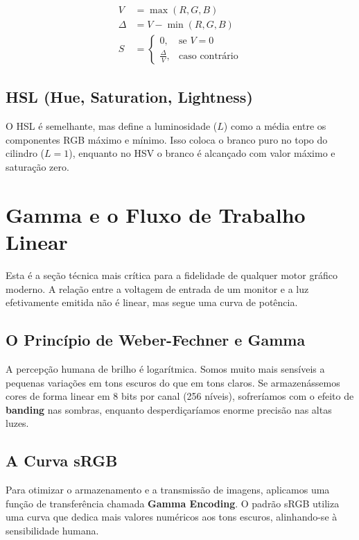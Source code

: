 \begin{align}
    V &= \max(R, G, B) \nonumber \\
    \Delta &= V - \min(R, G, B) \nonumber \\
    S &= \begin{cases} 0, & \text{se } V = 0 \\ \frac{\Delta}{V}, & \text{caso contrário} \end{cases} \nonumber
\end{align}

\subsection{HSL (Hue, Saturation, Lightness)}

O HSL é semelhante, mas define a luminosidade ($L$) como a média entre os componentes RGB máximo e mínimo. Isso coloca o branco puro no topo do cilindro ($L=1$), enquanto no HSV o branco é alcançado com valor máximo e saturação zero.

\section{Gamma e o Fluxo de Trabalho Linear}

Esta é a seção técnica mais crítica para a fidelidade de qualquer motor gráfico moderno. A relação entre a voltagem de entrada de um monitor e a luz efetivamente emitida não é linear, mas segue uma curva de potência.

\subsection{O Princípio de Weber-Fechner e Gamma}

A percepção humana de brilho é logarítmica. Somos muito mais sensíveis a pequenas variações em tons escuros do que em tons claros. Se armazenássemos cores de forma linear em 8 bits por canal (256 níveis), sofreríamos com o efeito de \textbf{banding} nas sombras, enquanto desperdiçaríamos enorme precisão nas altas luzes.

\subsection{A Curva sRGB}

Para otimizar o armazenamento e a transmissão de imagens, aplicamos uma função de transferência chamada \textbf{Gamma Encoding}. O padrão sRGB utiliza uma curva que dedica mais valores numéricos aos tons escuros, alinhando-se à sensibilidade humana.

